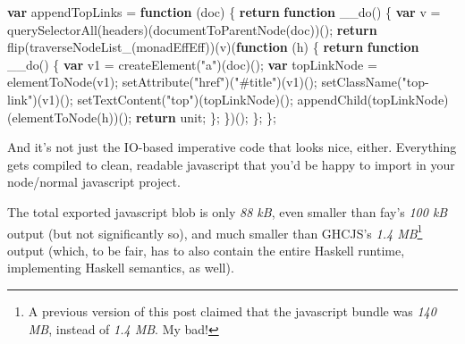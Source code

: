 \documentclass[]{article}
\newenvironment{Shaded}{}{}
\newcommand{\KeywordTok}[1]{\textcolor[rgb]{0.00,0.44,0.13}{\textbf{{#1}}}}
\newcommand{\StringTok}[1]{\textcolor[rgb]{0.25,0.44,0.63}{{#1}}}
\newcommand{\ControlFlowTok}[1]{\textcolor[rgb]{0.00,0.44,0.13}{\textbf{{#1}}}}
\newcommand{\OperatorTok}[1]{\textcolor[rgb]{0.40,0.40,0.40}{{#1}}}
\newcommand{\AttributeTok}[1]{\textcolor[rgb]{0.49,0.56,0.16}{{#1}}}
\newcommand{\NormalTok}[1]{{#1}}
\begin{document}
\begin{Shaded}
\begin{Highlighting}[]
\KeywordTok{var} \NormalTok{appendTopLinks }\OperatorTok{=} \KeywordTok{function} \NormalTok{(doc) }\OperatorTok{\{}
    \ControlFlowTok{return} \KeywordTok{function} \AttributeTok{__do}\NormalTok{() }\OperatorTok{\{}
        \KeywordTok{var} \NormalTok{v }\OperatorTok{=} \AttributeTok{querySelectorAll}\NormalTok{(headers)(}\AttributeTok{documentToParentNode}\NormalTok{(doc))()}\OperatorTok{;}
        \ControlFlowTok{return} \AttributeTok{flip}\NormalTok{(}\AttributeTok{traverseNodeList_}\NormalTok{(monadEffEff))(v)(}\KeywordTok{function} \NormalTok{(h) }\OperatorTok{\{}
            \ControlFlowTok{return} \KeywordTok{function} \AttributeTok{__do}\NormalTok{() }\OperatorTok{\{}
                \KeywordTok{var} \NormalTok{v1 }\OperatorTok{=} \AttributeTok{createElement}\NormalTok{(}\StringTok{"a"}\NormalTok{)(doc)()}\OperatorTok{;}
                \KeywordTok{var} \NormalTok{topLinkNode }\OperatorTok{=} \AttributeTok{elementToNode}\NormalTok{(v1)}\OperatorTok{;}
                \AttributeTok{setAttribute}\NormalTok{(}\StringTok{"href"}\NormalTok{)(}\StringTok{"#title"}\NormalTok{)(v1)()}\OperatorTok{;}
                \AttributeTok{setClassName}\NormalTok{(}\StringTok{"top-link"}\NormalTok{)(v1)()}\OperatorTok{;}
                \AttributeTok{setTextContent}\NormalTok{(}\StringTok{"top"}\NormalTok{)(topLinkNode)()}\OperatorTok{;}
                \AttributeTok{appendChild}\NormalTok{(topLinkNode)(}\AttributeTok{elementToNode}\NormalTok{(h))()}\OperatorTok{;}
                \ControlFlowTok{return} \NormalTok{unit}\OperatorTok{;}
            \OperatorTok{\};}
        \OperatorTok{\}}\NormalTok{)()}\OperatorTok{;}
    \OperatorTok{\};}
\OperatorTok{\};}
\end{Highlighting}
\end{Shaded}

And it's not just the IO-based imperative code that looks nice, either.
Everything gets compiled to clean, readable javascript that you'd be happy to
import in your node/normal javascript project.

The total exported javascript blob is only \emph{88 kB}, even smaller than fay's
\emph{100 kB} output (but not significantly so), and much smaller than GHCJS's
\emph{1.4 MB}\footnote{A previous version of this post claimed that the
  javascript bundle was \emph{140 MB}, instead of \emph{1.4 MB}. My bad!} output
(which, to be fair, has to also contain the entire Haskell runtime, implementing
Haskell semantics, as well).
\end{document}
